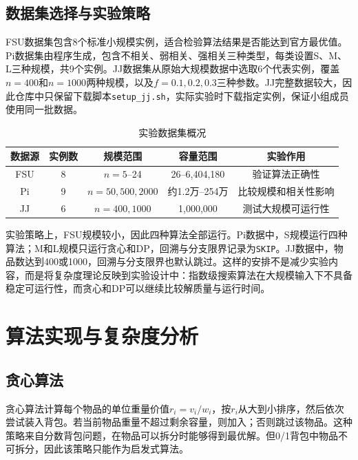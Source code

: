 \documentclass[10.5pt,a4paper,fontset=none]{ctexart}
\begin{document}
\subsection{数据集选择与实验策略}

FSU数据集包含8个标准小规模实例，适合检验算法结果是否能达到官方最优值。Pi数据集由程序生成，包含不相关、弱相关、强相关三种类型，每类设置S、M、L三种规模，共9个实例。JJ数据集从原始大规模数据中选取6个代表实例，覆盖$n=400$和$n=1000$两种规模，以及$f=0.1,0.2,0.3$三种参数。JJ完整数据较大，因此仓库中只保留下载脚本\texttt{setup\_jj.sh}，实际实验时下载指定实例，保证小组成员使用同一批数据。

\begin{table}[!htbp]
\centering
\footnotesize
\caption{实验数据集概况}
\begin{tabular}{ccccc}
\toprule
数据源 & 实例数 & 规模范围 & 容量范围 & 实验作用 \\
\midrule
FSU & 8 & $n=5$--24 & 26--6,404,180 & 验证算法正确性 \\
Pi & 9 & $n=50,500,2000$ & 约1.2万--254万 & 比较规模和相关性影响 \\
JJ & 6 & $n=400,1000$ & 1,000,000 & 测试大规模可运行性 \\
\bottomrule
\end{tabular}
\end{table}

实验策略上，FSU规模较小，因此四种算法全部运行。Pi数据中，S规模运行四种算法；M和L规模只运行贪心和DP，回溯与分支限界记录为\texttt{SKIP}。JJ数据中，物品数达到400或1000，回溯与分支限界也默认跳过。这样的安排不是减少实验内容，而是将复杂度理论反映到实验设计中：指数级搜索算法在大规模输入下不具备稳定可运行性，而贪心和DP可以继续比较解质量与运行时间。


\section{算法实现与复杂度分析}

\subsection{贪心算法}

贪心算法计算每个物品的单位重量价值$r_i=v_i/w_i$，按$r_i$从大到小排序，然后依次尝试装入背包。若当前物品重量不超过剩余容量，则加入；否则跳过该物品。这种策略来自分数背包问题，在物品可以拆分时能够得到最优解。但0/1背包中物品不可拆分，因此该策略只能作为启发式算法。
\end{document}
